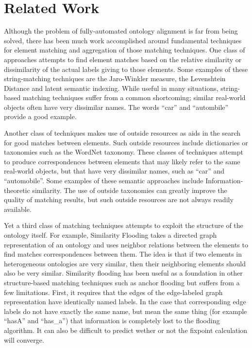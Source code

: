 \documentclass[letterpaper,twocolumn,12pt]{article}
\begin{document}

\section{Related Work}

Although the problem of fully-automated ontology alignment is far from being solved,
there has been much work accomplished around fundamental techniques for element
matching and aggregation of those matching techniques. One class of approaches
attempts to find element matches based on the relative similarity or dissimilarity
of the actual labels giving to those elements. Some examples of these string-matching 
techniques are the Jaro-Winkler measure, the Levenshtein Distance and latent semantic 
indexing.
%
While useful in many situations, string-based matching techniques suffer from a common 
shortcoming; similar real-world objects often have very dissimilar names. The words
``car'' and ``autombile'' provide a good example.

Another class of techniques makes use of outside resources as aids in the search for
good matches between elements. Such outside resources include dictionaries or taxonomies
such as the WordNet taxonomy. These classes of techniques attempt to produce correspondences
between elements that may likely refer to the same real-world objects, but that have very
dissimilar names, such as ``car'' and ``automobile''. Some examples of these semantic 
approaches include Information-theoretic similarity.
%
The use of outside taxonomies can greatly improve the quality of matching results,
but such outside resources are not always readily available.

Yet a third class of matching techniques attempts to exploit the structure of the ontology
itself. For example, Similarity Flooding takes a directed graph representation of an 
ontology and uses neighbor relations between the elements to find matches correspondences
between them. The idea is that if two elements in heterogeneous ontologies are very similar,
then their neighboring elements should also be very similar.
%
Similarity flooding has been useful as a foundation in other structure-based
matching techniques such as anchor flooding 
but suffers from 
a few limitations. First, it requires that the edges of the edge-labeled graph 
representation have identically named labels. In the case that corresponding edge labels
do not have exactly the same name, but mean the same thing (for example ``hasA'' and ``has\_a'')
that information is completely lost to the flooding algorithm. It can also be difficult to predict
wether or not the fixpoint calculation will converge.
\newline
\end{document}
